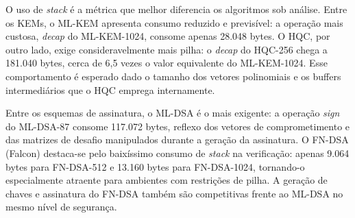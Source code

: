\begin{table}[ht]
\centering
\caption{Uso de memória \textit{stack} por esquema de assinatura
digital e operação (bytes). Medido via \textit{stack painting}
com \texttt{pthread} de 4\,MB e compilação \texttt{-O0}.
Medição pendente para variantes SLH-DSA-SHAKE.}
\label{tab:stack_sig}
\end{table}

O uso de \textit{stack} é a métrica que melhor diferencia os
algoritmos sob análise.
Entre os KEMs, o ML-KEM apresenta consumo reduzido e previsível:
a operação mais custosa, \textit{decap} do ML-KEM-1024, consome
apenas 28.048 bytes.
O HQC, por outro lado, exige consideravelmente mais pilha: o
\textit{decap} do HQC-256 chega a 181.040 bytes, cerca de
6,5 vezes o valor equivalente do ML-KEM-1024.
Esse comportamento é esperado dado o tamanho dos vetores
polinomiais e os buffers intermediários que o HQC emprega
internamente.

Entre os esquemas de assinatura, o ML-DSA é o mais exigente:
a operação \textit{sign} do ML-DSA-87 consome 117.072 bytes,
reflexo dos vetores de comprometimento e das matrizes
de desafio manipulados durante a geração da assinatura.
O FN-DSA (Falcon) destaca-se pelo baixíssimo consumo de
\textit{stack} na verificação: apenas 9.064 bytes para FN-DSA-512
e 13.160 bytes para FN-DSA-1024, tornando-o especialmente atraente
para ambientes com restrições de pilha.
A geração de chaves e assinatura do FN-DSA também são competitivas
frente ao ML-DSA no mesmo nível de segurança.

